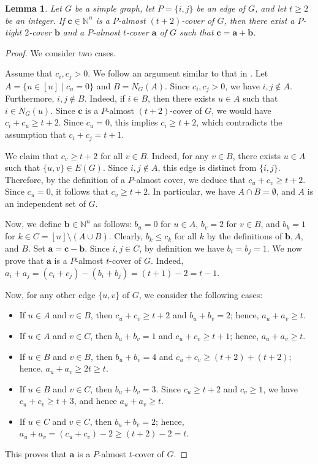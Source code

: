 \documentclass[12pt,amscd]{amsart}
\newtheorem{lem}[thm]{Lemma}
\theoremstyle{definition}
\numberwithin{equation}{section}
\begin{document}
\begin{lem}\label{lem_decomp}
Let $G$ be a simple graph, let $P = \{i,j\}$ be an edge of $G$, and let $t \ge 2$ be an integer. If $\mathbf{c} \in \mathbb{N}^n$ is a $P$-almost $(t+2)$-cover of $G$, then there exist a $P$-tight $2$-cover $\mathbf{b}$ and a $P$-almost $t$-cover $\mathbf{a}$ of $G$ such that $\mathbf{c} = \mathbf{a} + \mathbf{b}$.
\end{lem}
\begin{proof}
We consider two cases. 
\medskip 

 Assume that $c_i, c_j > 0$. We follow an argument similar to that in \cite[Theorem 5.1]{HHT}. Let $A = \{u \in [n] \mid c_u = 0\}$ and $B = N_G(A)$. Since $c_i, c_j > 0$, we have $i, j \notin A$. Furthermore, $i, j \notin B$. Indeed, if $i \in B$, then there exists $u \in A$ such that $i \in N_G(u)$. Since $\mathbf{c}$ is a $P$-almost $(t+2)$-cover of $G$, we would have $c_i + c_u \ge t+2$. Since $c_u = 0$, this implies $c_i \ge t+2$, which contradicts the assumption that $c_i + c_j = t+1$. 

We claim that $c_v \ge t+2$ for all $v \in B$. Indeed, for any $v \in B$, there exists $u \in A$ such that $\{u,v\} \in E(G)$. Since $i, j \notin A$, this edge is distinct from $\{i,j\}$. Therefore, by the definition of a $P$-almost cover, we deduce that $c_u + c_v \ge t+2$. Since $c_u = 0$, it follows that $c_v \ge t+2$. In particular, we have $A \cap B = \emptyset$, and $A$ is an independent set of $G$.

Now, we define $\mathbf{b} \in \mathbb{N}^n$ as follows: $b_u = 0$ for $u \in A$, $b_v = 2$ for $v \in B$, and $b_k = 1$ for $k \in C = [n] \setminus (A \cup B)$. Clearly, $b_k \le c_k$ for all $k$ by the definitions of $\mathbf{b}, A,$ and $B$. Set $\mathbf{a} = \mathbf{c} - \mathbf{b}$. Since $i, j \in C$, by definition we have $b_i = b_j = 1$. We now prove that $\mathbf{a}$ is a $P$-almost $t$-cover of $G$. Indeed, $a_i + a_j = (c_i + c_j) - (b_i + b_j) = (t+1) - 2 = t-1$. 

Now, for any other edge $\{u,v\}$ of $G$, we consider the following cases:
\begin{itemize}
    \item If $u \in A$ and $v \in B$, then $c_u + c_v \ge t+2$ and $b_u + b_v = 2$; hence, $a_u + a_v \ge t$.
    \item If $u \in A$ and $v \in C$, then $b_u + b_v = 1$ and $c_u + c_v \ge t+1$; hence, $a_u + a_v \ge t$.
    \item If $u \in B$ and $v \in B$, then $b_u + b_v = 4$ and $c_u + c_v \ge (t+2) + (t+2)$; hence, $a_u + a_v \ge 2t \ge t$.
    \item If $u \in B$ and $v \in C$, then $b_u + b_v = 3$. Since $c_u \ge t+2$ and $c_v \ge 1$, we have $c_u + c_v \ge t+3$, and hence $a_u + a_v \ge t$.
    \item If $u \in C$ and $v \in C$, then $b_u + b_v = 2$; hence, $a_u + a_v = (c_u + c_v) - 2 \ge (t+2) - 2 = t$.
\end{itemize}
This proves that $\mathbf{a}$ is a $P$-almost $t$-cover of $G$.


\end{proof}
\end{document}
